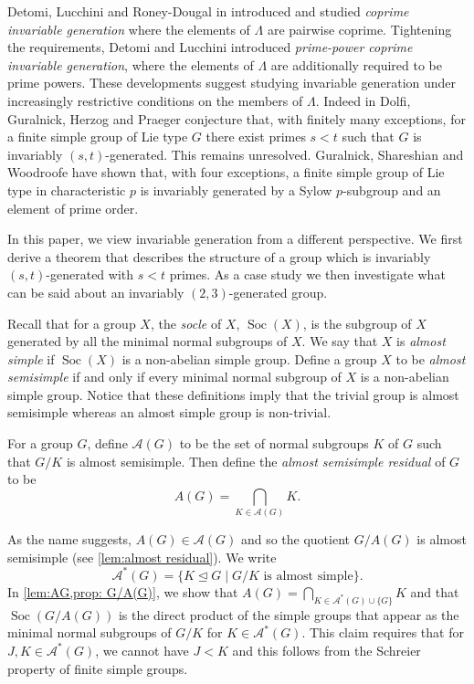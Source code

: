 \documentclass[12pt,a4paper]{amsart}
\DeclareMathOperator{\Soc}{Soc}
\begin{document}
  Detomi, Lucchini and   Roney-Dougal in \cite{MR3320229} introduced and studied \emph{coprime invariable generation}  where the elements of $\Lambda$ are pairwise coprime.  Tightening the requirements, Detomi and  Lucchini \cite{DETOMI2015683}
introduced \emph{prime-power coprime invariable generation}, where the elements of $\Lambda$ are additionally required to be prime powers. These developments suggest studying invariable generation under increasingly restrictive conditions on the members of $\Lambda$. Indeed in
  \cite[Section 6, Conjecture]{MR2901064}
Dolfi, Guralnick,  Herzog  and Praeger conjecture that, with finitely many exceptions, for a finite simple group of Lie type $G$ there  exist   primes $s<t$ such that $G$ is invariably $(s,t)$-generated. This remains unresolved.
Guralnick, Shareshian and Woodroofe \cite{MR4779375} have   shown that, with four exceptions, a finite simple group of Lie type in characteristic $p$ is invariably generated by a Sylow $p$-subgroup   and an element of prime order.

In this paper, we view  invariable generation from a different perspective.
We first derive a  theorem that describes the structure of a group which is invariably $(s,t)$-generated  with $s<t$   primes. As a case study we then investigate what can be said about an invariably $(2,3)$-generated group.


Recall that for a group $X$, the \emph{socle} of $X$, $\Soc(X)$, is the subgroup of $X$ generated by all the minimal normal subgroups of $X$. We say that $X$ is \emph{almost simple} if $\Soc(X)$ is a non-abelian simple group. Define a group  $X$ to be \emph{almost semisimple}  if and only if  every minimal normal subgroup of $X$ is a non-abelian simple group.  Notice that these definitions imply that the trivial group is almost semisimple whereas an almost simple group is non-trivial.




\begin{definition}\label{def:AG}
For a group $G$, define   $\mathcal{A}(G)$ to be the set of normal subgroups $K$ of $G$ such that $G/K$ is almost semisimple. Then define the \emph{almost semisimple   residual} of $G$ to be
$$ A(G)=  \bigcap_{K\in \mathcal A(G)} K.$$
\end{definition}
As the name suggests, $A(G) \in \mathcal A(G)$ and so the quotient   $G/A(G)$ is almost semisimple (see \cref{lem:almost residual}). We write $$\mathcal A^*(G)=\{K \unlhd G\mid G/K \text { is almost simple}\}.$$
In \cref{lem:AG,prop: G/A(G)}, we show that $A(G) = \bigcap_{K\in \mathcal A^*(G)\cup\{G\}}K$ and that $\Soc(G/A(G))$ is the direct product of the simple groups that appear as the minimal normal subgroups of $G/K$ for $K\in \mathcal A^*(G)$.  This claim requires that for $J,K \in \mathcal A^*(G)$, we cannot have $J<K$ and this follows from the Schreier property of finite simple groups.
\end{document}

